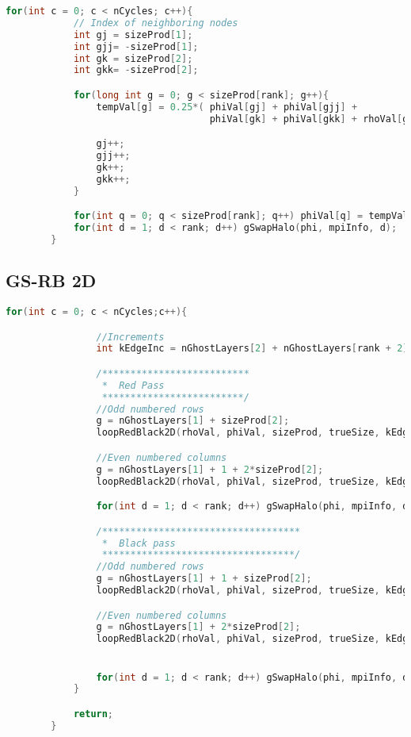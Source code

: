 	\begin{lstlisting}[language=c, caption = Code snippet 2D jacobian]
		for(int c = 0; c < nCycles; c++){
			// Index of neighboring nodes
			int gj = sizeProd[1];
			int gjj= -sizeProd[1];
			int gk = sizeProd[2];
			int gkk= -sizeProd[2];

			for(long int g = 0; g < sizeProd[rank]; g++){
				tempVal[g] = 0.25*(	phiVal[gj] + phiVal[gjj] +
									phiVal[gk] + phiVal[gkk] + rhoVal[g]);

				gj++;
				gjj++;
				gk++;
				gkk++;
			}

			for(int q = 0; q < sizeProd[rank]; q++) phiVal[q] = tempVal[q];
			for(int d = 1; d < rank; d++) gSwapHalo(phi, mpiInfo, d);
		}
	\end{lstlisting}

	\newpage
	\subsection{GS-RB 2D}
	\label{sec:GS_RB_2D}
	\begin{lstlisting}[language=c, caption = Main loop]
			for(int c = 0; c < nCycles;c++){

				//Increments
				int kEdgeInc = nGhostLayers[2] + nGhostLayers[rank + 2] + sizeProd[2];

				/**************************
				 *	Red Pass
				 *************************/
				//Odd numbered rows
				g = nGhostLayers[1] + sizeProd[2];
				loopRedBlack2D(rhoVal, phiVal, sizeProd, trueSize, kEdgeInc, g, gj, gjj, gk, gkk);

				//Even numbered columns
				g = nGhostLayers[1] + 1 + 2*sizeProd[2];
				loopRedBlack2D(rhoVal, phiVal, sizeProd, trueSize, kEdgeInc, g, gj, gjj, gk, gkk);

				for(int d = 1; d < rank; d++) gSwapHalo(phi, mpiInfo, d);

				/***********************************
				 *	Black pass
				 **********************************/
				//Odd numbered rows
				g = nGhostLayers[1] + 1 + sizeProd[2];
				loopRedBlack2D(rhoVal, phiVal, sizeProd, trueSize, kEdgeInc, g, gj, gjj, gk, gkk);

				//Even numbered columns
				g = nGhostLayers[1] + 2*sizeProd[2];
				loopRedBlack2D(rhoVal, phiVal, sizeProd, trueSize, kEdgeInc, g, gj, gjj, gk, gkk);


				for(int d = 1; d < rank; d++) gSwapHalo(phi, mpiInfo, d);
			}

			return;
		}
	\end{lstlisting}

